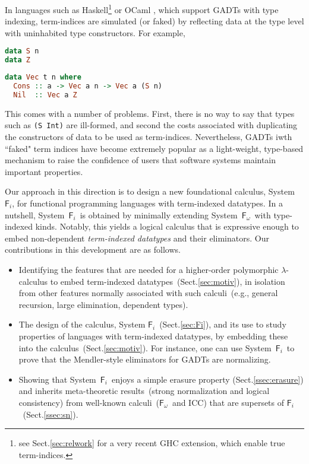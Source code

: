 \documentclass{llncs}
\newcommand{\Fi}{\ensuremath{\mathsf{F}_i}}
\newcommand{\Fw}{\ensuremath{\mathsf{F}_\omega}}
\renewcommand{\S}[0]{Sect.\;}
\begin{document}
In languages such as Haskell\footnote{see \S\ref{sec:relwork} for
        a very recent GHC extension, which enable true term-indices.}
	or OCaml \cite{GarNor11}, which support GADTs with type indexing,
term-indices are simulated (or faked) by reflecting data at the type level
with uninhabited type constructors. For example,\vspace*{-2pt}
\begin{lstlisting}[basicstyle={\ttfamily\small},language=Haskell,mathescape]
data S n
data Z
\end{lstlisting}\vspace*{-8pt}
\begin{lstlisting}[basicstyle={\ttfamily\small},language=Haskell,mathescape]
data Vec t n where
  Cons :: a -> Vec a n -> Vec a (S n)
  Nil  :: Vec a Z
\end{lstlisting}\vspace*{-2pt}
This comes with a number of problems. First, there is no way to say
that types such as {\tt (S Int)} are ill-formed, and second the costs
associated with duplicating the constructors of data to be used
as term-indices.
Nevertheless, GADTs iwth ``faked" term indices have become extremely popular
as a light-weight, type-based mechanism to raise the confidence of users
that software systems maintain important properties.

Our approach in this direction is to design a new foundational calculus,
System~\Fi, for functional programming languages with term-indexed
datatypes.  In a nutshell, System~\Fi\ is obtained by minimally extending
System~\Fw\ with type-indexed kinds.  Notably, this yields a logical
calculus that is expressive enough to embed non-dependent
\emph{term-indexed datatypes} and their eliminators. Our contributions in
this development are as follows.\vspace*{-.8ex}
\begin{itemize}
\item 
  Identifying the features that are needed for a higher-order polymorphic
  $\lambda$-calculus to embed term-indexed datatypes~(\S\ref{sec:motiv}),
  in isolation from other features normally associated with such
  calculi~(e.g., general recursion, large elimination, dependent types).
\item 
  The design of the calculus, System \Fi\ (\S\ref{sec:Fi}), and its use to
  study properties of languages with term-indexed datatypes, by embedding
  these into the calculus~(\S\ref{sec:motiv}).  For instance, one can use
  System~\Fi\ to prove that the Mendler-style eliminators for GADTs
  \cite{AhnShe11} are normalizing.
\item 
  Showing that System~\Fi\ enjoys a simple erasure
  property (\S\ref{ssec:erasure}) 
  and inherits meta-theoretic
  results~(strong normalization and logical consistency) from well-known
  calculi~(\Fw\ and ICC) that are supersets of \Fi~(\S\ref{ssec:sn}).
\end{itemize}\vspace*{-3pt}
\end{document}
